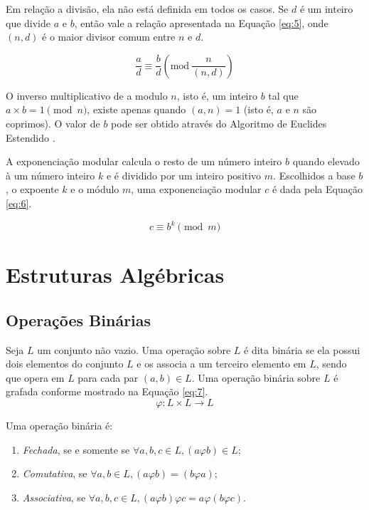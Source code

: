 Em relação a divisão, ela não está definida em todos os casos. Se \(d\) é um inteiro que divide \(a\) e \(b\), então vale a relação apresentada na Equação \ref{eq:5}, onde \((n, d)\) é o maior divisor comum entre \(n\) e \(d\).

\begin{equation}
  \frac{a}{d} \equiv \frac{b}{d}\left(\mbox{mod}\ \frac{n}{(n,d)}\right) \label{eq:5}%
\end{equation}

O inverso multiplicativo de a modulo \(n\), isto é, um inteiro \(b\) tal que \(a \times b = 1 \pmod  n\), existe apenas quando \((a, n) = 1\) (isto é, $a$ e $n$ são coprimos). O valor de \(b\) pode ser obtido através do Algoritmo de Euclides Estendido \cite{Halim:2013}.
\par A exponenciação modular calcula o resto de um número inteiro \(b\) quando elevado à um número inteiro \(k\) e é dividido por um inteiro positivo \(m\). Escolhidos a base \(b\), o expoente \(k\) e o módulo \(m\), uma exponenciação modular \(c\) é dada pela Equação \ref{eq:6}.

\begin{equation}
  c \equiv b^{k}\pmod m \label{eq:6}
\end{equation}

%
%
\section{Estruturas Algébricas}

%
%
\subsection{Operações Binárias}
Seja \(L\) um conjunto não vazio. Uma operação  sobre \(L\) é dita binária se ela possui dois elementos do conjunto \(L\) e os associa a um terceiro elemento em \(L\), sendo que opera em \(L\) para cada par \((a,b) \in L\). Uma operação binária sobre \(L\) é grafada conforme mostrado na Equação \ref{eq:7}.
\begin{equation}
  \varphi: L \times L \to L \label{eq:7}
\end{equation}

Uma operação binária é:
\begin{enumerate}
  \item \textit{Fechada}, se e somente se \( \forall a,b,c  \in L, (a \varphi b) \in L \);
  \item \textit{Comutativa}, se \( \forall a,b \in L , (a \varphi b) = (b \varphi a)\);
  \item \textit{Associativa}, se \( \forall a,b,c \in L, (a \varphi b) \varphi c = a \varphi (b \varphi c)\).
\end{enumerate}

